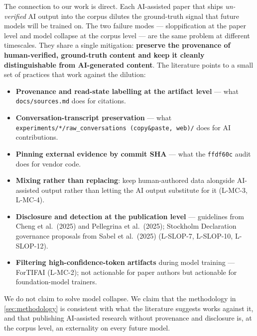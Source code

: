 \documentclass[11pt,a4paper]{article}
\begin{document}
The connection to our work is direct. Each AI-assisted paper that ships
\emph{un-verified} AI output into the corpus dilutes the ground-truth
signal that future models will be trained on. The two failure modes
--- sloppification at the paper level and model collapse at the corpus
level --- are the same problem at different timescales. They share a
single mitigation: \textbf{preserve the provenance of human-verified,
ground-truth content and keep it cleanly distinguishable from
AI-generated content}. The literature points to a small set of
practices that work against the dilution:
\begin{itemize}
  \item \textbf{Provenance and read-state labelling at the artifact
        level} --- what \texttt{docs/sources.md} does for citations.
  \item \textbf{Conversation-transcript preservation} --- what
        \texttt{experiments/*/raw\_conversations (copy\&paste, web)/}
        does for AI contributions.
  \item \textbf{Pinning external evidence by commit SHA} --- what the
        \texttt{ffdf60c} audit does for vendor code.
  \item \textbf{Mixing rather than replacing}: keep human-authored data
        alongside AI-assisted output rather than letting the AI output
        substitute for it (L-MC-3, L-MC-4).
  \item \textbf{Disclosure and detection at the publication level} ---
        guidelines from Cheng et al.\ (2025) and Pellegrina et al.\
        (2025); Stockholm Declaration governance proposals from Sabel
        et al.\ (2025) (L-SLOP-7, L-SLOP-10, L-SLOP-12).
  \item \textbf{Filtering high-confidence-token artifacts} during model
        training --- ForTIFAI (L-MC-2); not actionable for paper
        authors but actionable for foundation-model trainers.
\end{itemize}
We do not claim to solve model collapse. We claim that the methodology
in \cref{sec:methodology} is consistent with what the literature
suggests works against it, and that publishing AI-assisted research
without provenance and disclosure is, at the corpus level, an
externality on every future model.
\end{document}

